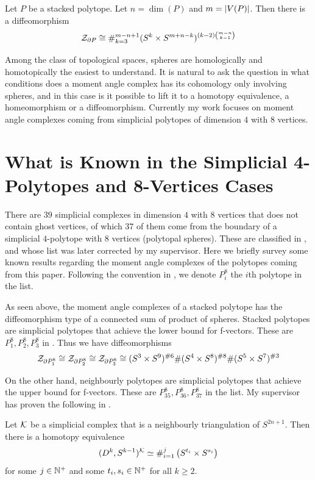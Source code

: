 \documentclass[a4paper]{article}
\begin{document}
\begin{thm}
Let $P$ be a stacked polytope. Let $n=\dim(P)$ and $m=\abs{V(P)}$. Then there is a diffeomorphism $$\mathcal{Z}_{\partial P}\cong\#_{k=3}^{m-n+1}(S^k\times S^{m+n-k})^{(k-2)\binom{m-n}{k-1}}$$
\end{thm}

Among the class of topological spaces, spheres are homologically and homotopically the easiest to understand. It is natural to ask the question in what conditions does a moment angle complex has its cohomology only involving spheres, and in this case is it possible to lift it to a homotopy equivalence, a homeomorphism or a diffeomorphism. Currently my work focuses on moment angle complexes coming from simplicial polytopes of dimension $4$ with $8$ vertices.  

\section*{What is Known in the Simplicial 4-Polytopes and 8-Vertices Cases}
There are $39$ simplicial complexes in dimension $4$ with $8$ vertices that does not contain ghost vertices, of which $37$ of them come from the boundary of a simplicial $4$-polytope with $8$ vertices (polytopal spheres). These are classified in \cite{Grunbaum}, and whose list was later corrected by my supervisor. Here we briefly survey some known results regarding the moment angle complexes of the polytopes coming from this paper. Following the convention in \cite{Grunbaum}, we denote $P_i^8$ the $i$th polytope in the list. 

As seen above, the moment angle complexes of a stacked polytope has the diffeomorphism type of a connected sum of product of spheres. Stacked polytopes are simplicial polytopes that achieve the lower bound for f-vectors. These are $P_1^8,P_2^8,P_3^8$ in \cite{Grunbaum}. Thus we have diffeomorphisms $$\mathcal{Z}_{\partial P_1^8}\cong\mathcal{Z}_{\partial P_2^8}\cong\mathcal{Z}_{\partial P_3^8}\cong(S^3\times S^9)^{\#6}\#(S^4\times S^8)^{\#8}\#(S^5\times S^7)^{\#3}$$

On the other hand, neighbourly polytopes are simplicial polytopes that achieve the upper bound for f-vectors. These are $P_{35}^8,P_{36}^8,P_{37}^8$ in the list. My supervisor has proven the following in \cite{Amaranta}. 

\begin{thm}
Let $\mathcal{K}$ be a simplicial complex that is a neighbourly triangulation of $S^{2n+1}$. Then there is a homotopy equivalence $$(D^k,S^{k-1})^{\mathcal{K}}\simeq\#_{i=1}^j\left(S^{t_i}\times S^{s_i}\right)$$ for some $j\in\mathbb{N}^+$ and some $t_i,s_i\in\mathbb{N}^+$ for all $k\geq 2$. 
\end{thm}
\end{document}
